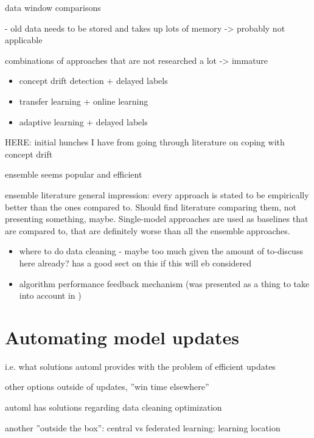 data window comparisons

- old data needs to be stored and takes up lots of memory \cite{conceptdriftsurvey} -> probably not applicable

combinations of approaches that are not researched a lot -> immature

\begin{itemize}
    \item concept drift detection + delayed labels \cite{mlforstreamingsurvey}
    \item transfer learning + online learning \cite{mlforstreamingsurvey}
    \item adaptive learning + delayed labels \cite{mlforstreamingsurvey}
\end{itemize}

HERE: initial hunches I have from going through literature on coping with concept drift

ensemble seems popular and efficient

ensemble literature general impression: every approach is stated to be empirically better than the ones compared to. Should find literature comparing them, not presenting something, maybe. Single-model approaches are used as baselines that are compared to, that are definitely worse than all the ensemble approaches.



\begin{itemize}
    \item where to do data cleaning - maybe too much given the amount of to-discuss here already? \cite{mlforstreamingsurvey} has a good sect on this if this will eb considered
    \item algorithm performance feedback mechanism (was presented as a thing to take into account in \cite{streamminingchallenges})
\end{itemize}

\section{Automating model updates}

i.e. what solutions automl provides with the problem of efficient updates

other options outside of updates, ''win time elsewhere''

automl has solutions regarding data cleaning optimization

another ''outside the box'': central vs federated learning: learning location

